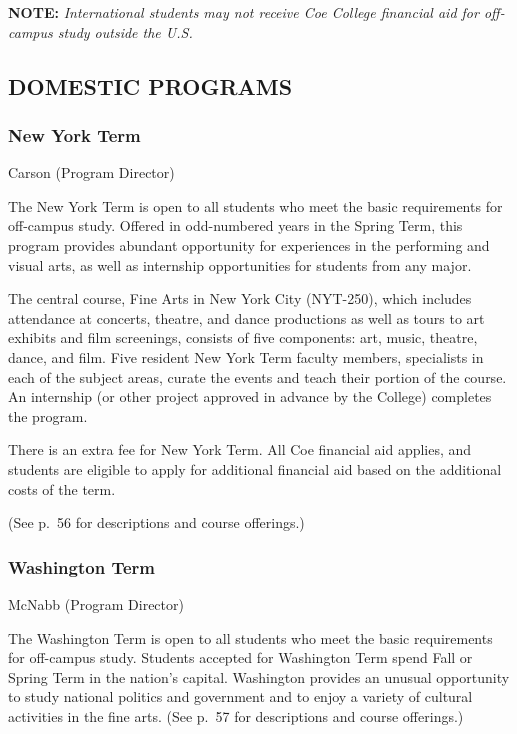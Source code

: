 \documentclass[
  letterpaper,
]{scrbook}
\begin{document}
\textbf{NOTE:} \emph{International students may not receive Coe College
financial aid for off-campus study outside the U.S.}

\subsection{DOMESTIC PROGRAMS}\label{domestic-programs}

\subsubsection{New York Term}\label{new-york-term}

Carson (Program Director)

The New York Term is open to all students who meet the basic
requirements for off-campus study. Offered in odd-numbered years in the
Spring Term, this program provides abundant opportunity for experiences
in the performing and visual arts, as well as internship opportunities
for students from any major.

The central course, Fine Arts in New York City (NYT-250), which includes
attendance at concerts, theatre, and dance productions as well as tours
to art exhibits and film screenings, consists of five components: art,
music, theatre, dance, and film. Five resident New York Term faculty
members, specialists in each of the subject areas, curate the events and
teach their portion of the course. An internship (or other project
approved in advance by the College) completes the program.

There is an extra fee for New York Term. All Coe financial aid applies,
and students are eligible to apply for additional financial aid based on
the additional costs of the term.

(See p.~56 for descriptions and course offerings.)

\subsubsection{Washington Term}\label{washington-term}

McNabb (Program Director)

The Washington Term is open to all students who meet the basic
requirements for off-campus study. Students accepted for Washington Term
spend Fall or Spring Term in the nation's capital. Washington provides
an unusual opportunity to study national politics and government and to
enjoy a variety of cultural activities in the fine arts. (See p.~57 for
descriptions and course offerings.)
\end{document}
